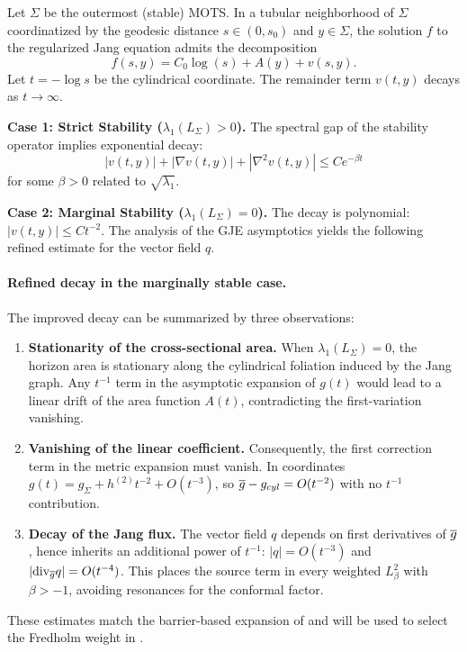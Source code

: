 \begin{lemma}\label{lem:SharpAsymptotics}
Let $\Sigma$ be the outermost (stable) MOTS. In a tubular neighborhood of $\Sigma$ coordinatized by the geodesic distance $s \in (0, s_0)$ and $y \in \Sigma$, the solution $f$ to the regularized Jang equation admits the decomposition
\begin{equation}
    f(s,y) = C_0 \log(s) + A(y) + v(s,y).
\end{equation}
Let $t = -\log s$ be the cylindrical coordinate. The remainder term $v(t,y)$ decays as $t \to \infty$.

\textbf{Case 1: Strict Stability ($\lambda_1(L_\Sigma) > 0$).}
The spectral gap of the stability operator implies exponential decay:
\begin{equation}
    |v(t,y)| + |\nabla v(t,y)| + |\nabla^2 v(t,y)| \le C e^{-\beta t}
\end{equation}
for some $\beta > 0$ related to $\sqrt{\lambda_1}$.

\textbf{Case 2: Marginal Stability ($\lambda_1(L_\Sigma) = 0$).}
The decay is polynomial: $|v(t,y)| \le C t^{-2}$.
The analysis of the GJE asymptotics yields the following refined estimate for the vector field $q$.

\paragraph{Refined decay in the marginally stable case.}
The improved decay can be summarized by three observations:
\begin{enumerate}
    \item \textbf{Stationarity of the cross-sectional area.} When $\lambda_1(L_\Sigma)=0$, the horizon area is stationary along the cylindrical foliation induced by the Jang graph. Any $t^{-1}$ term in the asymptotic expansion of $g(t)$ would lead to a linear drift of the area function $A(t)$, contradicting the first-variation vanishing.
    \item \textbf{Vanishing of the linear coefficient.} Consequently, the first correction term in the metric expansion must vanish. In coordinates $g(t) = g_\Sigma + h^{(2)} t^{-2} + O(t^{-3})$, so $\overline{g} - g_{cyl} = O(t^{-2})$ with no $t^{-1}$ contribution.
    \item \textbf{Decay of the Jang flux.} The vector field $q$ depends on first derivatives of $\overline{g}$, hence inherits an additional power of $t^{-1}$: $|q| = O(t^{-3})$ and $|\mathrm{div}_{\overline{g}} q| = O(t^{-4})$. This places the source term in every weighted $L^2_\beta$ with $\beta>-1$, avoiding resonances for the conformal factor.
\end{enumerate}
These estimates match the barrier-based expansion of \cite{braykhuri2010,hankhuri2013} and will be used to select the Fredholm weight in .
\end{lemma}


